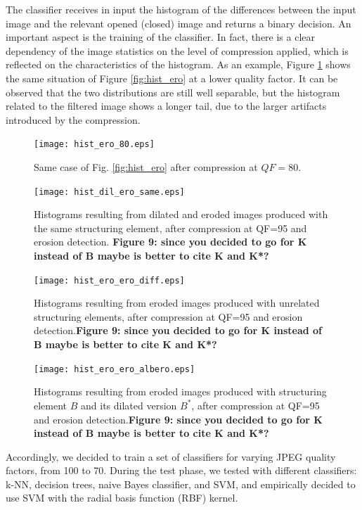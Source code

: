 \documentclass[review]{elsarticle}
\begin{document}
The classifier receives in input the histogram of the differences between the input image and the relevant opened (closed) image and returns a binary decision. An important aspect is the training of the classifier. In fact, there is a clear dependency of the image statistics on the level of compression applied, which is reflected on the characteristics of the histogram. As an example, Figure \ref{fig:hist_ero_80} shows the same situation of Figure \ref{fig:hist_ero} at a lower quality factor. It can be observed that the two distributions are still well separable, but the histogram related to the filtered image shows a longer tail, due to the larger artifacts introduced by the compression.

\begin{figure}[t!]%
	\centering
	\texttt{[image: hist\_ero\_80.eps]}
	\caption{Same case of Fig. \ref{fig:hist_ero} after compression at $QF = 80$.}
	\label{fig:hist_ero_80}%
\end{figure}

\begin{figure}[t!]
	\centering
	\texttt{[image: hist\_dil\_ero\_same.eps]}
	\caption{Histograms resulting from dilated and eroded images produced with the same structuring element, after compression at QF=95 and erosion detection. \textbf{Figure 9: since you decided to go for K instead of B maybe is better to cite K and K*?}}
	\label{fig:hist_dil_ero_same}
\end{figure}

\begin{figure}[t!]
	\centering
	\texttt{[image: hist\_ero\_ero\_diff.eps]}
	\caption{Histograms resulting from eroded images produced with unrelated structuring elements, after compression at QF=95 and erosion detection.\textbf{Figure 9: since you decided to go for K instead of B maybe is better to cite K and K*?}}
	\label{fig:hist_ero_ero_diff}
\end{figure}

\begin{figure}[t!]
	\centering
	\texttt{[image: hist\_ero\_ero\_albero.eps]}
	\caption{Histograms resulting from eroded images produced with structuring element $B$ and its dilated version $B^*$, after compression at QF=95 and erosion detection.\textbf{Figure 9: since you decided to go for K instead of B maybe is better to cite K and K*?}}
	\label{fig:hist_ero_ero_albero}
\end{figure}

Accordingly, we decided to train a set of classifiers for varying JPEG quality factors, from 100 to 70. During the test phase, we tested with different classifiers: k-NN, decision trees, naive Bayes classifier, and SVM, and empirically decided to use SVM with the radial basis function (RBF) kernel. 
\end{document}
